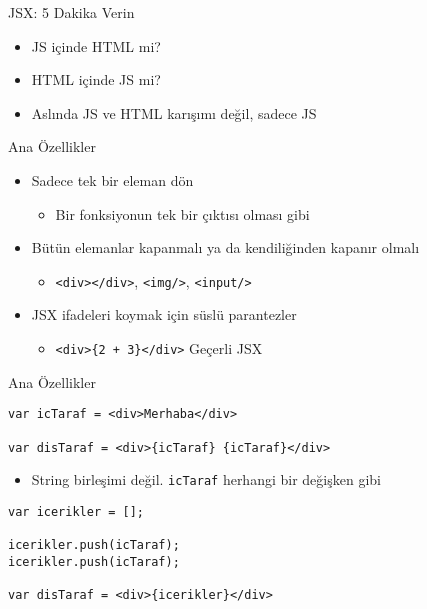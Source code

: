 \documentclass[presentation]{beamer}
\begin{document}
\begin{frame}[label=sec-4]{JSX: 5 Dakika Verin}
\begin{itemize}
\item JS içinde HTML mi?
\item HTML içinde JS mi?
\item Aslında JS ve HTML karışımı değil, sadece JS
\end{itemize}
\end{frame}

\begin{frame}[fragile,label=sec-5]{Ana Özellikler}
 \begin{itemize}
\item Sadece tek bir eleman dön
\begin{itemize}
\item Bir fonksiyonun tek bir çıktısı olması gibi
\end{itemize}
\item Bütün elemanlar kapanmalı ya da kendiliğinden kapanır olmalı
\begin{itemize}
\item \texttt{<div></div>}, \texttt{<img/>}, \texttt{<input/>}
\end{itemize}
\item JSX ifadeleri koymak için süslü parantezler
\begin{itemize}
\item \texttt{<div>\{2 + 3\}</div>} Geçerli JSX
\end{itemize}
\end{itemize}
\end{frame}

\begin{frame}[fragile,label=sec-6]{Ana Özellikler}
 \begin{verbatim}
var icTaraf = <div>Merhaba</div>

var disTaraf = <div>{icTaraf} {icTaraf}</div>
\end{verbatim}
\begin{itemize}
\item String birleşimi değil. \texttt{icTaraf} herhangi bir değişken gibi
\end{itemize}
\begin{verbatim}
var icerikler = [];

icerikler.push(icTaraf);
icerikler.push(icTaraf);

var disTaraf = <div>{icerikler}</div>
\end{verbatim}
\end{frame}
\end{document}
